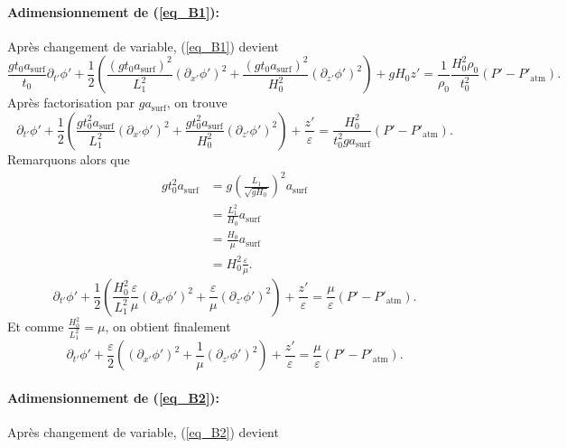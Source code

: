 \documentclass[12pt,a4paper]{article}
\numberwithin{equation}{section}
\begin{document}
\paragraph{Adimensionnement de (\ref{eq_B1}):}
Après changement de variable, (\ref{eq_B1}) devient
\begin{equation*}
     \frac{g t_0 a_{\text{surf}}}{t_0}\partial_{t'} \phi' + \frac{1}{2}\left(\frac{(g t_0 a_{\text{surf}})^2}{L_1^2}(\partial_{x'}\phi')^2+ \frac{(g t_0 a_{\text{surf}})^2}{H_0^2}(\partial_{z'}\phi')^2\right) + g H_0 z' = \frac{1}{\rho_0}\frac{H_0^2\rho_0}{t_0^2}(P'-P'_{\text{atm}}).
\end{equation*}
Après factorisation par $ga_\text{surf}$, on trouve
\begin{equation*}
    \partial_{t'} \phi' + \frac{1}{2}\left(\frac{g t_0^2 a_{\text{surf}}}{L_1^2}(\partial_{x'}\phi')^2+ \frac{g t_0^2 a_{\text{surf}}}{H_0^2}(\partial_{z'}\phi')^2\right) + \frac{z'}{\varepsilon}  = \frac{H_0^2}{t_0^2ga_\text{surf}}(P'-P'_{\text{atm}}).
\end{equation*}
Remarquons alors que
\begin{equation}
\begin{split}
    g t_0^2 a_{\text{surf}} &= g\left(\frac{L_1}{\sqrt{gH_0}}\right)^2a_\text{surf}\\
    &=  \frac{L_1^2}{H_0}a_\text{surf}\\
    &= \frac{H_0}{\mu}a_\text{surf} \\
    &= H_0^2\frac{\varepsilon}{\mu} .
\end{split}
\end{equation}
\begin{equation*}
    \partial_{t'} \phi' + \frac{1}{2}\left(\frac{H_0^2}{L_1^2}\frac{\varepsilon}{\mu}(\partial_{x'}\phi')^2+\frac{\varepsilon}{\mu}(\partial_{z'}\phi')^2\right) + \frac{z'}{\varepsilon} = \frac{\mu}{\varepsilon}(P'-P'_{\text{atm}}).
\end{equation*}
Et comme $\frac{H_0^2}{L_1^2} = \mu$, on obtient finalement
\begin{equation}
    \partial_{t'} \phi' + \frac{\varepsilon}{2}\left((\partial_{x'}\phi')^2+\frac{1}{\mu}(\partial_{z'}\phi')^2\right) + \frac{z'}{\varepsilon} = \frac{\mu}{\varepsilon}(P'-P'_{\text{atm}}).\label{eq_B1_adim}
\end{equation}

\paragraph{Adimensionnement de (\ref{eq_B2}):} Après changement de variable, (\ref{eq_B2}) devient
\end{document}
